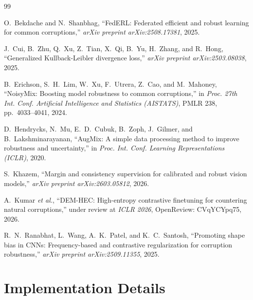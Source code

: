 \documentclass[10pt,twocolumn]{article}
\begin{document}
\begin{thebibliography}{99}

O.~Bekdache and N.~Shanbhag,
``{FedERL}: Federated efficient and robust learning for common corruptions,''
\emph{arXiv preprint arXiv:2508.17381}, 2025.

J.~Cui, B.~Zhu, Q.~Xu, Z.~Tian, X.~Qi, B.~Yu, H.~Zhang, and R.~Hong,
``Generalized {Kullback-Leibler} divergence loss,''
\emph{arXiv preprint arXiv:2503.08038}, 2025.

B.~Erichson, S.~H.~Lim, W.~Xu, F.~Utrera, Z.~Cao, and M.~Mahoney,
``{NoisyMix}: Boosting model robustness to common corruptions,''
in \emph{Proc. 27th Int. Conf. Artificial Intelligence and Statistics (AISTATS)},
PMLR 238, pp.~4033--4041, 2024.

D.~Hendrycks, N.~Mu, E.~D.~Cubuk, B.~Zoph, J.~Gilmer, and B.~Lakshminarayanan,
``{AugMix}: A simple data processing method to improve robustness and uncertainty,''
in \emph{Proc. Int. Conf. Learning Representations (ICLR)}, 2020.

S.~Khazem,
``Margin and consistency supervision for calibrated and robust vision models,''
\emph{arXiv preprint arXiv:2603.05812}, 2026.

A.~Kumar \emph{et al.},
``{DEM-HEC}: High-entropy contrastive finetuning for countering natural corruptions,''
under review at \emph{ICLR 2026}, OpenReview: CVqYCYpq75, 2026.

R.~N.~Ranabhat, L.~Wang, A.~K.~Patel, and K.~C.~Santosh,
``Promoting shape bias in {CNNs}: Frequency-based and contrastive regularization for corruption robustness,''
\emph{arXiv preprint arXiv:2509.11355}, 2025.

\end{thebibliography}

\appendix

\section{Implementation Details}
\label{app:implementation}
\end{document}
